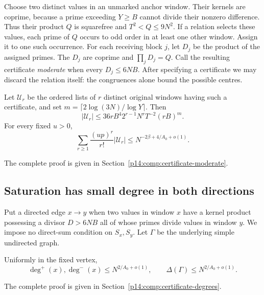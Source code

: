 Choose two distinct values in an unmarked anchor window. Their kernels
are coprime, because a prime exceeding $Y\ge B$ cannot divide their
nonzero difference. Thus their product $Q$ is squarefree and
$T^2<Q\le9N^2$. If a relation selects these values, each prime of $Q$
occurs to odd order in at least one other window. Assign it to one such
occurrence. For each receiving block $j$, let $D_j$ be the product of
the assigned primes. The $D_j$ are coprime and $\prod_jD_j=Q$.
Call the resulting certificate \emph{moderate} when every $D_j\le6NB$.
After specifying a certificate we may discard the relation itself:
the congruences alone bound the possible centres.

\begin{lemma}
\label{p1:core:moderate}
Let $\mathcal U_r$ be the ordered lists of $r$ distinct original windows having
such a certificate, and set
$m=\lceil 2\log(3N)/\log Y\rceil$. Then
\begin{equation}
 |\mathcal U_r|
 \le36rB^4 2^{r-1}N^rT^{-2}(rB)^m.
 \label{p1:core:moderate-count}
\end{equation}
For every fixed $u>0$,
\begin{equation}
 \sum_{r\ge1}\frac{(up)^r}{r!}|\mathcal U_r|
 \le N^{-2\beta+4/A_0+o(1)}.
 \label{p1:core:moderate-baseline}
\end{equation}
\end{lemma}
\noindent The complete proof is given in Section~\ref{p14:comp:certificate-moderate}.


\subsection{Saturation has small degree in both directions}

Put a directed edge $x\to y$ when two values in window $x$ have a
kernel product possessing a divisor $D>6NB$ all of whose primes divide
values in window $y$. We impose no direct-sum condition on $S_x,S_y$.
Let $\Gamma$ be the underlying simple undirected graph.

\begin{lemma}
\label{p1:core:degrees}
Uniformly in the fixed vertex,
\begin{equation}
 \deg^+(x),\deg^-(x)\le N^{2/A_0+o(1)},
 \qquad \Delta(\Gamma)\le N^{2/A_0+o(1)}.
 \label{p1:core:degree-bound}
\end{equation}
\end{lemma}
\noindent The complete proof is given in Section~\ref{p14:comp:certificate-degrees}.


